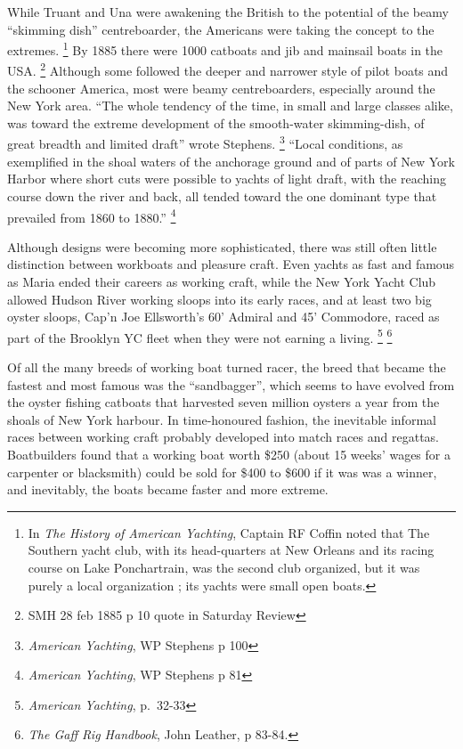 \documentclass[
  letterpaper,
]{scrbook}
\begin{document}
While Truant and Una were awakening the British to the potential of the
beamy ``skimming dish'' centreboarder, the Americans were taking the
concept to the extremes. \footnote{In \emph{The History of American
  Yachting}, Captain RF Coffin noted that The Southern yacht club, with
  its head-quarters at New Orleans and its racing course on Lake
  Ponchartrain, was the second club organized, but it was purely a local
  organization ; its yachts were small open boats.} By 1885 there were
1000 catboats and jib and mainsail boats in the USA. \footnote{SMH 28
  feb 1885 p 10 quote in Saturday Review} Although some followed the
deeper and narrower style of pilot boats and the schooner America, most
were beamy centreboarders, especially around the New York area. ``The
whole tendency of the time, in small and large classes alike, was toward
the extreme development of the smooth-water skimming-dish, of great
breadth and limited draft'' wrote Stephens. \footnote{\emph{American
  Yachting}, WP Stephens p 100} ``Local conditions, as exemplified in
the shoal waters of the anchorage ground and of parts of New York Harbor
where short cuts were possible to yachts of light draft, with the
reaching course down the river and back, all tended toward the one
dominant type that prevailed from 1860 to 1880.'' \footnote{\emph{American
  Yachting}, WP Stephens p 81}

Although designs were becoming more sophisticated, there was still often
little distinction between workboats and pleasure craft. Even yachts as
fast and famous as Maria ended their careers as working craft, while the
New York Yacht Club allowed Hudson River working sloops into its early
races, and at least two big oyster sloops, Cap'n Joe Ellsworth's 60'
Admiral and 45' Commodore, raced as part of the Brooklyn YC fleet when
they were not earning a living. \footnote{\emph{American Yachting},
  p.~32-33} \footnote{\emph{The Gaff Rig Handbook}, John Leather, p
  83-84.}

Of all the many breeds of working boat turned racer, the breed that
became the fastest and most famous was the ``sandbagger'', which seems
to have evolved from the oyster fishing catboats that harvested seven
million oysters a year from the shoals of New York harbour. In
time-honoured fashion, the inevitable informal races between working
craft probably developed into match races and regattas. Boatbuilders
found that a working boat worth \$250 (about 15 weeks' wages for a
carpenter or blacksmith) could be sold for \$400 to \$600 if it was was
a winner, and inevitably, the boats became faster and more extreme.
\end{document}
